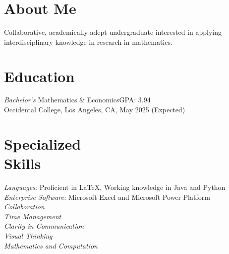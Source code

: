 \documentclass[margin, 10pt]{res} %
\begin{document}
\begin{resume}

\section{\sc About Me}
Collaborative, academically adept undergraduate interested in applying interdisciplinary knowledge in research in mathematics.

\section{\sc Education}

{\sl Bachelor's} Mathematics \& Economics\hfill GPA: 3.94 \\
Occidental College, Los Angeles, CA, May 2025 (Expected) \\


\section{\sc Specialized \\ Skills} 

{\sl Languages:} Proficient in \LaTeX, Working knowledge in Java and Python\\
{\sl Enterprise Software:} Microsoft Excel and Microsoft Power Platform\\
{\sl Collaboration}\\
{\sl Time Management}\\
{\sl Clarity in Communication}\\
{\sl Visual Thinking}\\
{\sl Mathematics and Computation}
 
 

\end{resume}
\end{document}
